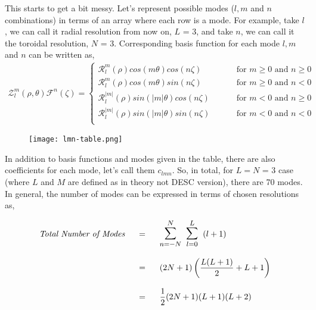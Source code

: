 This starts to get a bit messy. Let's represent possible modes ($l, m$ and $n$ combinations) in terms of an array where each row is a mode. For example, take $l$, we can call it radial resolution from now on, $L$ = 3, and take $n$, we can call it the toroidal resolution, $N$ = 3. Corresponding basis function for each mode $l, m$ and $n$ can be written as,
\begin{align}
    \mathcal{Z}_l^m (\rho,\theta) \mathcal{F}^n(\zeta) = \begin{cases}
        \mathcal{R}_l^{m}(\rho) cos(m\theta) cos(n\zeta)  \hspace{1cm}& \text{for } m\geq0 \text{ and } n\geq0\\[.1cm]
        \mathcal{R}_l^{m}(\rho) cos(m\theta) sin(n\zeta)  \hspace{1cm}& \text{for } m\geq0 \text{ and } n<0\\[.1cm]
        \mathcal{R}_l^{|m|}(\rho) sin(|m|\theta) cos(n\zeta)  \hspace{1cm}& \text{for } m<0 \text{ and } n\geq0\\[.1cm]
        \mathcal{R}_l^{|m|}(\rho) sin(|m|\theta) sin(n\zeta)  \hspace{1cm}& \text{for } m<0 \text{ and } n<0\\[.1cm]
    \end{cases}   \label{fourier-zernike-basis}
\end{align}

\begin{figure}[H]
    \centering
    \texttt{[image: lmn-table.png]}
\end{figure}

In addition to basis functions and modes given in the table, there are also coefficients for each mode, let's call them $c_{lmn}$. So, in total, for $L = N$ = 3 case (where $L$ and $M$ are defined as in theory not DESC version), there are 70 modes. In general, the number of modes can be expressed in terms of chosen resolutions as,

\begin{equation}
    \begin{split}
        \textit{Total Number of Modes} \hspace{0.5cm} &= \hspace{0.5cm} \mathlarger{\mathlarger{\sum}}_{n=-N}^{N} \hspace{0.2cm} \mathlarger{\mathlarger{\sum}}_{l=0}^{L} \hspace{0.2cm} (l+1) \\[0.3cm]
        &= \hspace{0.5cm} (2N+1) \left(\frac{L(L+1)}{2}+L+1\right)\\[0.3cm]
        &= \hspace{0.5cm} \frac{1}{2} (2N+1) (L+1)(L+2)
    \end{split}
\end{equation}


